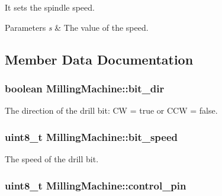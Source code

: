It sets the spindle speed. 


\begin{DoxyParams}{Parameters}
{\em s} & The value of the speed. \\
\hline
\end{DoxyParams}


\subsection{Member Data Documentation}
\hypertarget{class_milling_machine_a5ce9e8b53197142881889d113424f3be}{
\subsubsection[{bit\+\_\+dir}]{\setlength{\rightskip}{0pt plus 5cm}boolean Milling\+Machine\+::bit\+\_\+dir\hspace{0.3cm}{\ttfamily [private]}}}\label{class_milling_machine_a5ce9e8b53197142881889d113424f3be}


The direction of the drill bit\+: C\+W = true or C\+C\+W = false. 

\hypertarget{class_milling_machine_a1980b7b766917656ce78d25c11b3b5c3}{
\subsubsection[{bit\+\_\+speed}]{\setlength{\rightskip}{0pt plus 5cm}uint8\+\_\+t Milling\+Machine\+::bit\+\_\+speed\hspace{0.3cm}{\ttfamily [private]}}}\label{class_milling_machine_a1980b7b766917656ce78d25c11b3b5c3}


The speed of the drill bit. 

\hypertarget{class_milling_machine_a6e0a4a728c4063b82d0f726123817d69}{
\subsubsection[{control\+\_\+pin}]{\setlength{\rightskip}{0pt plus 5cm}uint8\+\_\+t Milling\+Machine\+::control\+\_\+pin\hspace{0.3cm}{\ttfamily [private]}}}\label{class_milling_machine_a6e0a4a728c4063b82d0f726123817d69}


